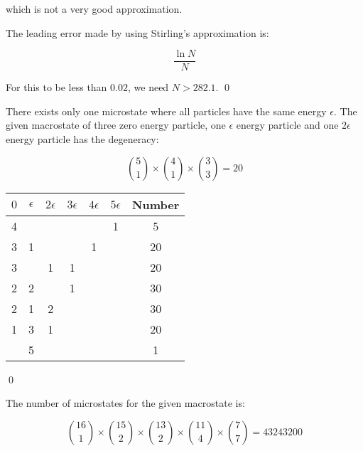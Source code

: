 \documentclass[12pt]{article}
\begin{document}
which is not a very good approximation.

The leading error made by using Stirling's approximation is:

\begin{equation}
    \frac{\ln{N}}{N}
\end{equation}

For this to be less than $0.02$, we need $N > 282.1$.
\qed


There exists only one microstate where all particles have the same energy $\epsilon$. The given macrostate of three zero energy particle, one $\epsilon$ energy particle and one $2\epsilon$ energy particle has the degeneracy:

\begin{equation}
    \binom{5}{1} \times \binom{4}{1} \times \binom{3}{3} = 20
\end{equation}

\begin{table}[h]
    \centering
    \begin{tabular}{|c|c|c|c|c|c|c|}
        \hline
        $0$ & $\epsilon$ & $2\epsilon$ & $3\epsilon$ & $4\epsilon$ & $5\epsilon$ & Number \\ \hline
        4   &            &             &             &             & 1           & 5      \\ \hline
        3   & 1          &             &             & 1           &             & 20     \\ \hline
        3   &            & 1           & 1           &             &             & 20     \\ \hline
        2   & 2          &             & 1           &             &             & 30     \\ \hline
        2   & 1          & 2           &             &             &             & 30     \\ \hline
        1   & 3          & 1           &             &             &             & 20     \\ \hline
            & 5          &             &             &             &             & 1      \\ \hline
    \end{tabular}
\end{table}
\qed


The number of microstates for the given macrostate is:

\begin{equation}
    \binom{16}{1} \times \binom{15}{2} \times \binom{13}{2} \times \binom{11}{4} \times \binom{7}{7} = 43243200
\end{equation}
\end{document}

